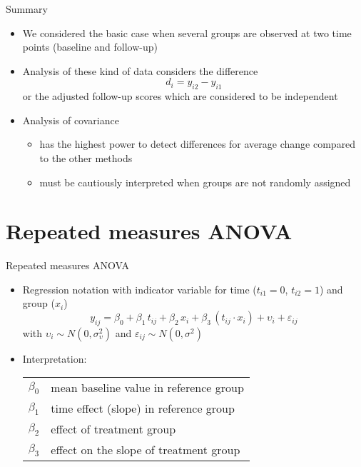 \documentclass[aspectratio=169]{beamer}
\begin{document}
\begin{frame}{Summary}
\begin{itemize}
  \item We considered the basic case when several groups are observed at
    two time points (baseline and follow-up)
  \item Analysis of these kind of data considers the difference
    \[
        d_i = y_{i2} - y_{i1}
    \]
    or the adjusted follow-up scores which are considered to be independent
  \item Analysis of covariance
  \begin{itemize}
    \item has the highest power to detect differences for average change
      compared to the other methods
    \item must be cautiously interpreted when groups are not randomly
      assigned
  \end{itemize}
\end{itemize}
\end{frame}

\appendix

\section{Repeated measures ANOVA}

\begin{frame}{Repeated measures ANOVA}
\begin{itemize}
  \item Regression notation with indicator variable for time ($t_{i1} = 0$,
    $t_{i2} = 1$) and\\ group ($x_i$)
    \[
      y_{ij} = \beta_0 + \beta_1 \, t_{ij} + \beta_2 \, x_i +
               \beta_3 \, (t_{ij} \cdot x_i) + \upsilon_i + \varepsilon_{ij}
    \]
    with $\upsilon_i \sim N(0, \sigma^2_\upsilon)$ and $\varepsilon_{ij}
    \sim N(0, \sigma^2)$
  \item Interpretation:
    \begin{center}
    \begin{tabular}{lp{10cm}}
    $\beta_0$ & mean baseline value in reference group\\
    $\beta_1$ & time effect (slope) in reference group\\
    $\beta_2$ & effect of treatment group\\
    $\beta_3$ & effect on the slope of treatment group
    \end{tabular}
    \end{center}
\end{itemize}
\end{frame}
\end{document}
